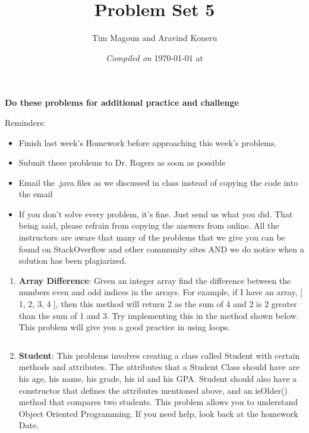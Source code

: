 \documentclass[11pt,fleqn]{article}
\begin{document}
\title{Problem Set 5}%
\author{Tim Magoun and Aravind Koneru}
\date{\textit{Compiled on} \today \hspace{1mm} at \currenttime}
\maketitle

\begin{center}
\textbf{Do these problems for additional practice and challenge}
\end{center}

Reminders:
\begin{itemize}
    \item
        Finish last week's Homework before approaching this week's problems.

    \item
        Submit these problems to Dr. Rogers as soon as possible

    \item
        Email the .java files as we discussed in class instead of copying the code into the email

    \item
        If you don't solve every problem, it's fine. Just send us what you did. That being said,
        please refrain from copying the answers from online. All the instructors are aware that many
        of the problems that we give you can be found on StackOverflow and other community sites AND
        we do notice when a solution has been plagiarized.

    \end{itemize}

\begin{enumerate}
    \item
        \textbf{Array Difference}: Given an integer array find the difference between the numbers even and odd indices in the arrays. For example, if I have an array, [ 1, 2, 3, 4 ], then this method will return 2 as the sum of 4 and 2 is 2 greater than the sum of 1 and 3. Try implementing this in the method shown below. This problem will give you a good practice in using loops.

        \inputminted{java}{diff.java}

    \item
        \textbf{Student}: This problems involves creating a class called Student with certain methods and attributes. The attributes that a Student Class should have are his age, his name, his grade, his id and his GPA. Student should also have a constructor that defines the attributes mentioned above, and an isOlder() method that compares two students. This problem allows you to understand Object Oriented Programming. If you need help, look back at the homework Date.

   \end{enumerate}
\end{document}
